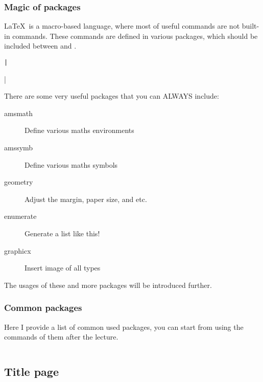 \begin{frame}[fragile]
	\frametitle{Magic of packages}
	\LaTeX\ is a macro-based language, where most of useful commands are not built-in commands. These commands are defined in various packages, which should be included between \LC{\documentclass} and \LC{}.
	\begin{command}
		\texttt|\usepackage[options]{package}|
	\end{command}
	There are some very useful packages that you can \alert{ALWAYS} include:
	\begin{description}
		\item[amsmath] Define various maths environments
		\item[amssymb] Define various maths symbols
		\item[geometry] Adjust the margin, paper size, and etc.
		\item[enumerate] Generate a list like this!
		\item[graphicx] Insert image of all types
	\end{description}
	The usages of these and more packages will be introduced further.
\end{frame}

\begin{frame}[fragile]
	\frametitle{Common packages}
	Here I provide a list of common used packages, you can start from using the commands of them after the lecture.

	\inputminted{latex}{examples/packages.tex}
\end{frame}

\subsection{Title page}

